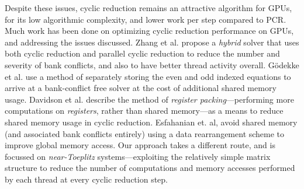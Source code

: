 Despite these issues,
cyclic reduction remains an attractive algorithm
for GPUs,
for its low algorithmic complexity,
and lower work per step compared to PCR.
Much work has been done on
optimizing cyclic reduction performance on GPUs,
and addressing the issues discussed.
Zhang et al. \cite{Zhang2010FTS} propose a
\emph{hybrid} solver
that uses both cyclic reduction and parallel cyclic reduction
to reduce the number and severity of bank conflicts,
and also to have better thread activity overall.
G{\"o}dekke et al. \cite{GoSt11CR}
use a method of separately storing
the even and odd indexed equations
to arrive at a bank-conflict free solver
at the cost of additional shared memory usage.
Davidson et al. \cite{davidson2011register}
describe the method of
\emph{register packing}---performing more computations
on \emph{registers}, rather than shared memory---as
a means to reduce shared memory usage in cyclic reduction.
Esfahanian et. al, \cite{esfahanian2014efficient}
avoid shared memory (and associated bank conflicts entirely)
using a data rearrangement scheme to improve global memory access.
Our approach takes a different route,
and is focussed on \emph{near-Toeplitz} systems---exploiting
the relatively simple matrix structure
to reduce the number of computations and memory accesses
performed by each thread
at every cyclic reduction step.
